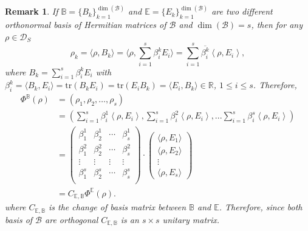 \documentclass[12pt,a4paper]{article}
\def\calB{\mathcal B}
\def\calD{\mathcal D}
\def\R{\mathbb R}
\def\tr{\text{tr}}
\newtheorem{remark}{Remark}
\numberwithin{equation}{section}
\begin{document}
\begin{remark}\label{change of basis}
	If $\mathbb{B}=\{B_k\}_{k=1}^{\dim(\calB)}$ and $\mathbb{E}=\{E_k\}_{k=1}^{\dim(\calB)}$ are two different orthonormal basis of Hermitian matrices of $\calB$ and $\dim(\calB)=s$, then for any $\rho\in \calD_{S}$
	\[\rho_k= \langle\rho,B_k\rangle= \langle \rho, \sum_{i=1}^{s}\beta_i^k E_i \rangle=\sum_{i=1}^{s}\overline{\beta_i^k}\left\langle \rho,  E_i \right\rangle, \]
	where $B_k=\sum_{i=1}^{s}\beta_i^k E_i$ with $\beta_i^k=\langle B_k,E_i\rangle=\tr(B_kE_i)=\tr(E_iB_k)=\langle E_i,B_k\rangle\in \R$, $1\leq i\leq s$. Therefore, 
	\begin{align*}
		\Phi^{\mathbb{B}}(\rho)&= (\rho_1, \rho_2, \dots, \rho_{s} )\\
		&= \left(\sum_{i=1}^{s}\beta_i^1\left\langle \rho,  E_i \right\rangle ,\sum_{i=1}^{s}\beta_i^2\left\langle \rho,  E_i \right\rangle,...\sum_{i=1}^{s}\beta_i^{s}\left\langle \rho,  E_i \right\rangle\right) \\
		&=\begin{pmatrix}
			\beta_1^1&\beta_2^1&\cdots&\beta_{s}^1\\
			\beta_1^2&\beta_2^2&\cdots&\beta_{s}^2\\
			\vdots&\vdots&\vdots&\vdots\\
			\beta_1^{s}&\beta_2^{s}&\cdots&\beta_{s}^{s}\\
		\end{pmatrix}\cdot\begin{pmatrix}
			\langle \rho,  E_1\rangle\\
			\langle \rho,  E_2\rangle\\
			\vdots\\
			\langle \rho,  E_s\rangle		
		\end{pmatrix}\\
		&= C_{\mathbb{E},\mathbb{B}}\Phi^{\mathbb{E}}(\rho).
	\end{align*}
	 where $C_{{\mathbb{E},\mathbb{B}}}$ is the change of basis matrix between $\mathbb{B}$ and $\mathbb{E}$. Therefore, since both basis of $\mathcal{B}$ are orthogonal $C_{{\mathbb{E},\mathbb{B}}}$ is an $s\times s$ unitary matrix.

\end{remark}
\end{document}
